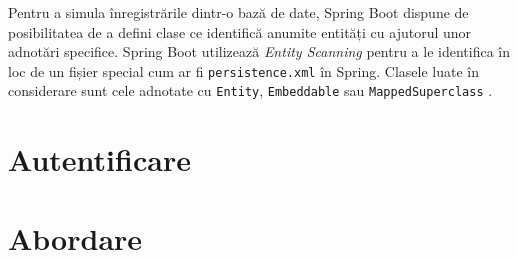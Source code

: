 Pentru a simula înregistrările dintr-o bază de date, Spring Boot dispune de posibilitatea de a defini clase ce identifică anumite entități cu ajutorul unor adnotări specifice. Spring Boot utilizează \textit{Entity Scanning} pentru a le identifica în loc de un fișier special cum ar fi \texttt{persistence.xml} în Spring. Clasele luate în considerare sunt cele adnotate cu \texttt{Entity}, \texttt{Embeddable} sau \texttt{MappedSuperclass} \cite{spring-boot-docs}.

\section{Autentificare}


\section{Abordare}

